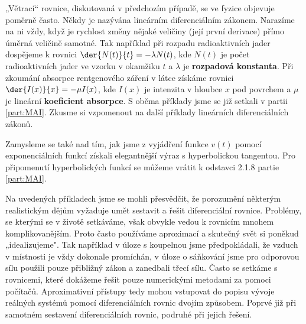     
  
  \begin{note}
    „Větrací“ rovnice, diskutovaná v předchozím případě, se ve fyzice objevuje poměrně často. Někdy
    je nazývána lineárním diferenciálním zákonem. Narazíme na ni vždy, když je rychlost změny nějaké
    veličiny (její první derivace) přímo úměrná veličině samotné. Tak například při rozpadu
    radioaktivních jader dospějeme k rovnici \(\der{N(t)}{t} = -\lambda N(t)\), kde \(N(t)\) je
    počet radioaktivních jader ve vzorku v okamžiku \(t\) a \(\lambda\) je \textbf{rozpadová
    konstanta}. Při zkoumání absorpce rentgenového záření v látce získáme rovnici \(\der{I(x)}{x} =
    -\mu I(x)\), kde \(I(x)\) je intenzita v hloubce \(x\) pod povrchem a \(\mu\) je lineární
    \textbf{koeficient absorpce}. S oběma příklady jsme se již setkali v partii \ref{part:MAI}.
    Zkusme si vzpomenout na další příklady lineárních diferenciálních zákonů.
  \end{note}

    
  \begin{note}
    Zamysleme se také nad tím, jak jsme z vyjádření funkce \(v(t)\) pomocí exponenciálních funkcí 
    získali elegantnější výraz s hyperbolickou tangentou. Pro připomenutí hyperbolických funkcí se 
    můžeme vrátit k odstavci 2.1.8 partie \ref{part:MAI}.
  \end{note}
  
  Na uvedených příkladech jsme se mohli přesvědčit, že porozumění některým realistickým dějům
  vyžaduje umět sestavit a řešit diferenciální rovnice. Problémy, se kterými se v životě setkáváme,
  však obvykle vedou k rovnicím mnohem komplikovanějším. Proto často používáme aproximací a skutečný
  svět si poněkud „idealizujeme". Tak například v úloze s koupelnou jsme předpokládali, že vzduch v
  místnosti je vždy dokonale promíchán, v úloze o sáňkování jsme pro odporovou sílu použili pouze
  přibližný zákon a zanedbali třecí sílu. Často se setkáme s rovnicemi, které dokážeme řešit pouze
  numerickými metodami za pomoci počítačů. Aproximativní přístupy tedy mohou vstupovat do popisu
  vývoje reálných systémů pomocí diferenciálních rovnic dvojím způsobem. Poprvé již při samotném
  sestavení diferenciálních rovnic, podruhé při jejich řešení.
  

